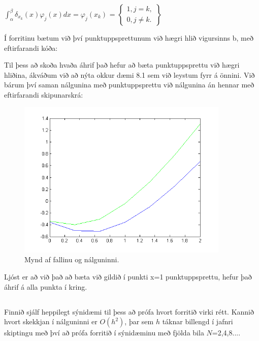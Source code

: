 \documentclass[11pt,a4paper,titlepage]{article}
\begin{document}
\begin{center}$\int_{\alpha}^{\beta}\delta_{x_{k}}(x)\varphi_{j}(x)dx = \varphi_{j}(x_{k})$
=
$\begin{Bmatrix}
1, j=k,
\\ 
0, j \neq k .
\end{Bmatrix}$\end{center}

Í forritinu bætum við því punktuppsprettunum við hægri hlið vigursinns b, með eftirfarandi kóða: 



Til þess að skoða hvaða áhrif það hefur að bæta punktuppsprettu við hægri hliðina, ákváðum við að nýta okkur dæmi 8.1 sem við leystum fyrr á önnini.
Við bárum því saman nálgunina með punktuppsprettu við nálgunina án hennar með eftirfarandi skipunarskrá:
 
   \begin{figure}[h!]
   	\centering
   	\includegraphics[width=0.9\textwidth]{mynd1_3.png}
   	\caption{Mynd af fallinu og nálguninni.}
   	\label{fig:awesome_image1}
   \end{figure}
Ljóst er að við það að bæta við gildið í punkti x=1 punktuppsprettu, hefur það áhrif á alla punkta í kring. 

\subsection{}
Finnið sjálf heppilegt sýnidæmi til þess að prófa hvort forritið virki rétt. Kannið hvort skekkjan í nálguninni er $O(h^2)$, þar sem $h$ táknar billengd í jafnri skiptingu með því að prófa forritið í sýnidæminu með fjölda bila $N$=2,4,8....
\end{document}
